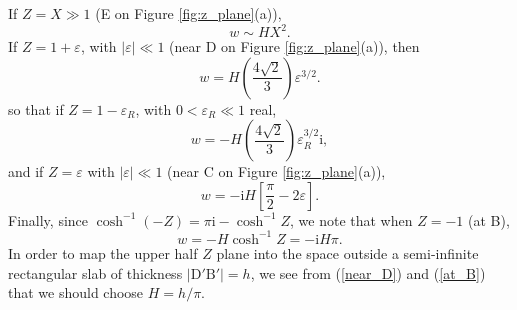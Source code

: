 If $Z=X\gg 1$ (E on Figure \ref{fig:z_plane}(a)),
\begin{equation}
w\sim HX^2.
\end{equation}
If $Z=1+\varepsilon$, with $|\varepsilon|\ll 1$
 (near D on Figure \ref{fig:z_plane}(a)), then 
\begin{equation}
w=H\left(\frac{4\sqrt 2}{3}\right)\varepsilon^{3/2}.
\label{near_D}
\end{equation}
so that if $Z=1-\varepsilon_R$, with $0<\varepsilon_R\ll 1$
real,
\begin{equation}
w=-H\left(\frac{4\sqrt 2}{3}\right)\varepsilon_R^{3/2}\text{i},
\end{equation}
and if $Z=\varepsilon$ with
$|\varepsilon|\ll 1$ (near C on Figure \ref{fig:z_plane}(a)),
\begin{equation}
w
=-\text{i}H\left\lbrack \frac{\pi}{2}-2\varepsilon\right\rbrack.
\end{equation}
Finally, since $\cosh^{-1}(-Z)=\pi \text{i}-\cosh^{-1}Z$,
we note that when $Z=-1$
(at B),
\begin{equation}
w=-H\cosh^{-1}Z=-\text{i}H\pi.
\label{at_B}
\end{equation}
In order to map the upper half $Z$ plane into the space outside a
semi-infinite rectangular slab of
thickness $|\text{D}'\text{B}'|=h$, we see from (\ref{near_D}) and (\ref{at_B})
that we should choose $H=h/\pi$.

